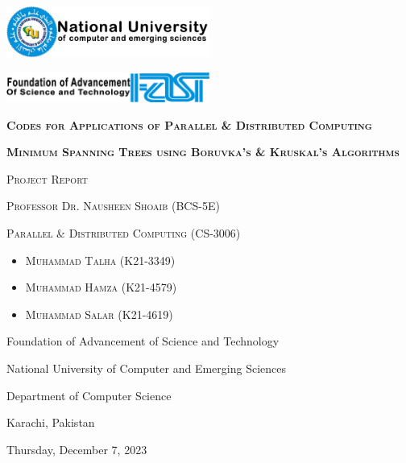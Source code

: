 \documentclass[a4paper, 12pt]{article}
\begin{document}
\begin{titlepage}
    \centering
    \vspace{3.5cm}  %
    \includegraphics[width=0.5\textwidth]{NU-logo.jpg}\par\vspace{1cm}  %
    \includegraphics[width=0.5\textwidth]{FAST.png}\par\vspace{1cm}     %
    \vspace{1cm}
    {\scshape\LARGE\textbf{Codes for Applications of Parallel \& Distributed Computing}\par}
    \vspace{1cm}
    {\scshape\Huge\textbf{Minimum Spanning Trees using Boruvka's \& Kruskal's Algorithms}\par}
    \vspace{1cm}
    {\scshape\Large Project Report\par}
    \vspace{1cm}
    {\scshape\Large Professor Dr. Nausheen Shoaib (BCS-5E)\par}
    \vspace{1cm}
    {\scshape\Large Parallel \& Distributed Computing (CS-3006)\par}
    \vspace{1cm}
    \begin{itemize}
        \item {\scshape\Large Muhammad Talha (K21-3349)\par}\vspace{0.25cm}
        \item {\scshape\Large Muhammad Hamza (K21-4579)\par}\vspace{0.25cm}
        \item {\scshape\Large Muhammad Salar (K21-4619)\par}
    \end{itemize}
    \vfill
    \vspace{1cm}    
    {Foundation of Advancement of Science and Technology\par}
    {National University of Computer and Emerging Sciences\par}
    {Department of Computer Science\par}
    {Karachi, Pakistan\par}
    {Thursday, December 7, 2023\par}
\end{titlepage}
\end{document}
